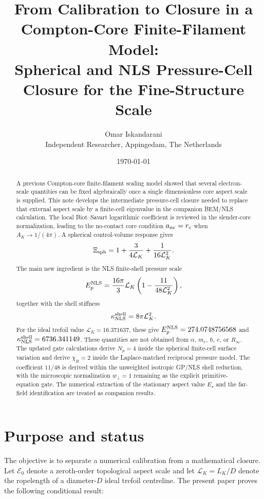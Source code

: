 \documentclass[11pt]{article}
\title{From Calibration to Closure in a Compton-Core Finite-Filament Model:\\
Spherical and NLS Pressure-Cell Closure for the Fine-Structure Scale}
\author{Omar Iskandarani\\
\small Independent Researcher, Appingedam, The Netherlands}
\date{\today}
\newcommand{\LK}{\mathcal L_K}
\newcommand{\Ezero}{\mathcal E_0}
\begin{document}
\maketitle

\begin{abstract}
A previous Compton-core finite-filament scaling model showed that several electron-scale
quantities can be fixed algebraically once a single dimensionless core aspect scale is supplied.
This note develops the intermediate pressure-cell closure needed to replace that external
aspect scale by a finite-cell eigenvalue in the companion BEM/NLS calculation.  The local
Biot--Savart logarithmic coefficient is reviewed in the slender-core normalization, leading to
the no-contact core condition \(a_{\rm nc}=r_c\) when \(A_K\to1/(4\pi)\).  A spherical
control-volume response gives
\[
  \Xi_{\rm sph}
  =
  1+\frac{3}{4\mathcal L_K}+\frac{1}{16\mathcal L_K^2}.
\]
The main new ingredient is the NLS finite-shell pressure scale
\[
  E_p^{\rm NLS}
  =
  \frac{16\pi}{3}\mathcal L_K
  \left(1-\frac{11}{48\mathcal L_K^2}\right),
\]
together with the shell stiffness
\[
  \kappa_{\rm NLS}^{\rm shell}=8\pi\mathcal L_K^2.
\]
For the ideal trefoil value \(\mathcal L_K=16.371637\), these give
\(E_p^{\rm NLS}=274.0748756568\) and
\(\kappa_{\rm NLS}^{\rm shell}=6736.341149\).  These quantities are not obtained from
\(\alpha\), \(m_e\), \(\hbar\), \(e\), or \(R_\infty\).  The updated gate
calculations derive \(N_p=4\) inside the spherical finite-cell surface
variation and derive \(\chi_R=2\) inside the Laplace-matched reciprocal
pressure model.  The coefficient \(11/48\) is derived within the unweighted
isotropic GP/NLS shell reduction, with the microscopic normalization
\(w_\perp=1\) remaining as the explicit primitive-equation gate.  The numerical
extraction of the stationary aspect value \(E_\star\) and the far-field
identification are treated as companion results.
\end{abstract}

\section{Purpose and status}

The objective is to separate a numerical calibration from a mathematical closure.  Let
\(\Ezero\) denote a zeroth-order topological aspect scale and let \(\LK=L_K/D\) denote the
ropelength of a diameter-\(D\) ideal trefoil centreline.  The present paper proves the following
conditional result:
\end{document}
